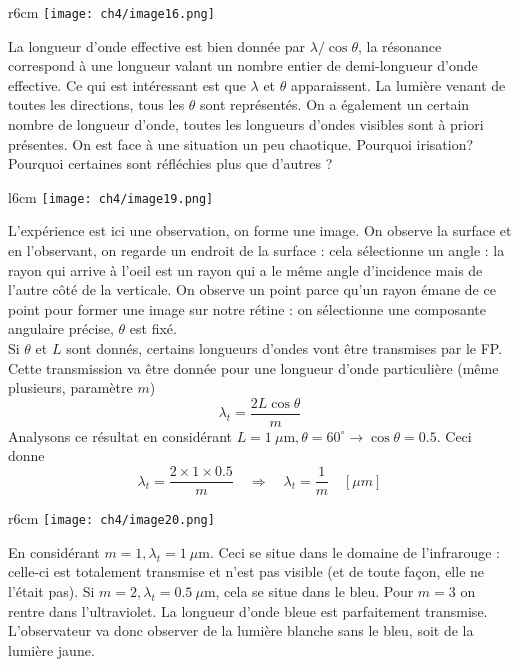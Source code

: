 	\begin{wrapfigure}[11]{r}{6cm}
	\vspace{-5mm}
	\texttt{[image: ch4/image16.png]}
	\end{wrapfigure}
La longueur d'onde  
effective est bien donnée par $\lambda/\cos\theta$, la résonance correspond à une longueur valant 
un nombre entier de demi-longueur d'onde effective. Ce qui est intéressant est que $\lambda$ et 
$\theta$ apparaissent. La lumière venant de toutes les directions, tous les $\theta$ sont représentés.
On a également un certain nombre de longueur d'onde, toutes les longueurs d'ondes visibles sont à 
priori présentes. On est face à une situation un peu chaotique. Pourquoi irisation? Pourquoi certaines 
sont réfléchies plus que d'autres ? \\

	\begin{wrapfigure}[5]{l}{6cm}
	\vspace{-10mm}
	\texttt{[image: ch4/image19.png]}
	\end{wrapfigure}
L'expérience est ici une observation, on forme une image. On observe la surface et en l'observant, on 
regarde un endroit de la surface : cela sélectionne un angle : la rayon qui arrive à l'oeil est un 
rayon qui a le même angle d'incidence mais de l'autre côté de la verticale. On observe un point 
parce qu'un rayon émane de ce point pour former une image sur notre rétine : on sélectionne une 
composante angulaire précise, $\theta$ est fixé.\\

Si $\theta$ et $L$ sont donnés, certains longueurs d'ondes vont être transmises par le FP. Cette 
transmission va être donnée pour une longueur d'onde particulière (même plusieurs, paramètre $m$)
\begin{equation}
\lambda_t = \dfrac{2L\cos\theta}{m}
\end{equation}
Analysons ce résultat en considérant $L=1\ \mu\text{m}, \theta = 60^\circ \rightarrow \cos\theta = 
0.5$. Ceci donne 
\begin{equation}
\lambda_t = \dfrac{2\times1\times 0.5}{m}\quad\Longrightarrow\quad \lambda_t = \frac{1}{m}\quad [\mu 
m]
\end{equation}
	\begin{wrapfigure}[7]{r}{6cm}
	\vspace{-5mm}
	\texttt{[image: ch4/image20.png]}
	\end{wrapfigure}
En considérant $m=1, \lambda_t=1\ \mu\text{m}$. Ceci se situe dans le domaine de l'infrarouge : 
celle-ci est totalement transmise et n'est pas visible (et de toute façon, elle ne l'était pas). 
Si $m=2, \lambda_t=0.5\ \mu$m, cela se situe dans le bleu. Pour $m=3$ on rentre dans l'ultraviolet. 
La longueur d'onde bleue est parfaitement transmise. L'observateur va donc observer de la lumière 
blanche sans le bleu, soit de la lumière jaune.\\

